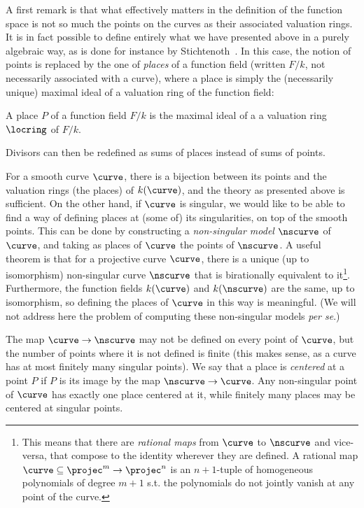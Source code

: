A first remark is that what effectively matters in the definition of the function space is not so much the points on the curves as their associated valuation
rings. It is in fact possible to define entirely what we have presented above in a purely algebraic way, as is done for instance by Stichtenoth~\cite{stichtenoth}.
In this case, the notion of points is replaced by the one of \emph{places} of a function field (written $F/k$, not necessarily associated with a curve), where a place is simply the (necessarily unique) maximal
ideal of a valuation ring of the function field:

\begin{defi}
A place $P$ of a function field $F/k$ is the maximal ideal of a a valuation ring $\locring$ of $F/k$. 
\end{defi}

Divisors can then be redefined as sums of places instead of sums of points.

For a smooth curve $\curve$, there is a bijection between its points and the valuation rings (the places) of $k(\curve)$, and the theory as presented above is sufficient.
On the other hand, if $\curve$ is singular, we would like to be able to find a way of defining places at (some of) its singularities, on top of the smooth points.
This can be done by constructing a \emph{non-singular model} $\nscurve$ of $\curve$,
and taking as places of $\curve$ the points of $\nscurve$. A useful theorem is that for a projective curve $\curve$, there is a unique (up to isomorphism) non-singular curve
$\nscurve$ that is birationally equivalent to it\footnote{This means that there are \emph{rational maps} from $\curve$ to $\nscurve$ and vice-versa, that compose to the identity wherever they are
defined.
A rational map $\curve \subseteq \projec^m \rightarrow \projec^n$ is an $n+1$-tuple of homogeneous polynomials of degree $m+1$ s.t. the polynomials do not jointly
vanish at any point of the curve.}. Furthermore, the function fields $k(\curve)$ and $k(\nscurve)$ are the same, up to isomorphism, so defining the places of $\curve$ in this
way is meaningful.
(We will not address here the problem of computing these non-singular models \emph{per se}.)

The map $\curve \rightarrow \nscurve$ may not be defined on every point of $\curve$, but the number of points where it is not defined is finite (this makes sense, as a curve
has at most finitely many singular points). We say that a place is \emph{centered} at a point $P$ if $P$ is its image by the map $\nscurve \rightarrow \curve$. Any non-singular
point of $\curve$ has exactly one place centered at it, while finitely many places may be centered at singular points.

